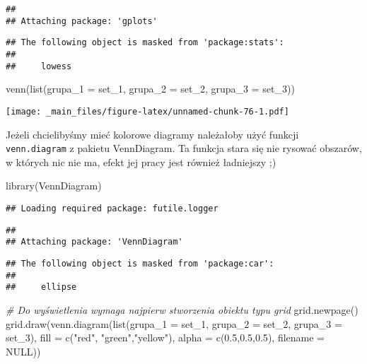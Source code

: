 \documentclass[
]{book}
\newenvironment{Shaded}{\begin{snugshade}}{\end{snugshade}}
\newcommand{\AttributeTok}[1]{\textcolor[rgb]{0.77,0.63,0.00}{#1}}
\newcommand{\CommentTok}[1]{\textcolor[rgb]{0.56,0.35,0.01}{\textit{#1}}}
\newcommand{\ConstantTok}[1]{\textcolor[rgb]{0.00,0.00,0.00}{#1}}
\newcommand{\FloatTok}[1]{\textcolor[rgb]{0.00,0.00,0.81}{#1}}
\newcommand{\FunctionTok}[1]{\textcolor[rgb]{0.00,0.00,0.00}{#1}}
\newcommand{\NormalTok}[1]{#1}
\newcommand{\StringTok}[1]{\textcolor[rgb]{0.31,0.60,0.02}{#1}}
\begin{document}
\begin{verbatim}
## 
## Attaching package: 'gplots'
\end{verbatim}

\begin{verbatim}
## The following object is masked from 'package:stats':
## 
##     lowess
\end{verbatim}

\begin{Shaded}
\begin{Highlighting}[]
\FunctionTok{venn}\NormalTok{(}\FunctionTok{list}\NormalTok{(}\AttributeTok{grupa\_1 =}\NormalTok{ set\_1, }\AttributeTok{grupa\_2 =}\NormalTok{ set\_2, }\AttributeTok{grupa\_3 =}\NormalTok{ set\_3))}
\end{Highlighting}
\end{Shaded}

\texttt{[image: \_main\_files/figure-latex/unnamed-chunk-76-1.pdf]}

Jeżeli chcielibyśmy mieć kolorowe diagramy należałoby użyć funkcji \texttt{venn.diagram} z pakietu VennDiagram. Ta funkcja stara się nie rysować obszarów, w których nic nie ma, efekt jej pracy jest również ładniejszy ;)

\begin{Shaded}
\begin{Highlighting}[]
\FunctionTok{library}\NormalTok{(VennDiagram)}
\end{Highlighting}
\end{Shaded}

\begin{verbatim}
## Loading required package: futile.logger
\end{verbatim}

\begin{verbatim}
## 
## Attaching package: 'VennDiagram'
\end{verbatim}

\begin{verbatim}
## The following object is masked from 'package:car':
## 
##     ellipse
\end{verbatim}

\begin{Shaded}
\begin{Highlighting}[]
\CommentTok{\# Do wyświetlenia wymaga najpierw stworzenia obiektu typu grid}
\FunctionTok{grid.newpage}\NormalTok{()}
\FunctionTok{grid.draw}\NormalTok{(}\FunctionTok{venn.diagram}\NormalTok{(}\FunctionTok{list}\NormalTok{(}\AttributeTok{grupa\_1 =}\NormalTok{ set\_1, }\AttributeTok{grupa\_2 =}\NormalTok{ set\_2, }\AttributeTok{grupa\_3 =}\NormalTok{ set\_3), }
                       \AttributeTok{fill =} \FunctionTok{c}\NormalTok{(}\StringTok{"red"}\NormalTok{, }\StringTok{"green"}\NormalTok{,}\StringTok{"yellow"}\NormalTok{), }
                       \AttributeTok{alpha =} \FunctionTok{c}\NormalTok{(}\FloatTok{0.5}\NormalTok{,}\FloatTok{0.5}\NormalTok{,}\FloatTok{0.5}\NormalTok{), }
                       \AttributeTok{filename =} \ConstantTok{NULL}\NormalTok{))}
\end{Highlighting}
\end{Shaded}
\end{document}
